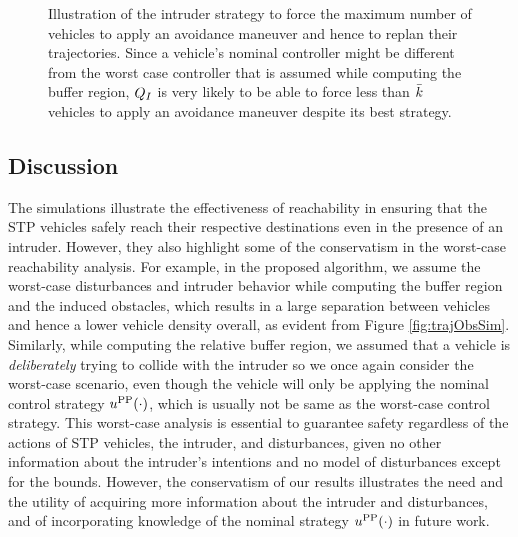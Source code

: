 \begin{figure}
\begin{subfigure}{.5\columnwidth}
  \subcaption{}
  \label{fig:normalcase3}
\end{subfigure}%
\caption{Illustration of the intruder strategy to force the maximum number of vehicles to apply an avoidance maneuver and hence to replan their trajectories. Since a vehicle's nominal controller might be different from the worst case controller that is assumed while computing the buffer region, $Q_{I}$ is very likely to be able to force less than $\bar{k}$ vehicles to apply an avoidance maneuver despite its best strategy.}
\label{fig:normalcase}
\end{figure}         

\subsection{Discussion \label{sec:discuss}}
The simulations illustrate the effectiveness of reachability in ensuring that the STP vehicles safely reach their respective destinations even in the presence of an intruder. However, they also highlight some of the conservatism in the worst-case reachability analysis. For example, in the proposed algorithm, we assume the worst-case disturbances and intruder behavior while computing the buffer region and the induced obstacles, which results in a large separation between vehicles and hence a lower vehicle density overall, as evident from Figure \ref{fig:trajObsSim}. Similarly, while computing the relative buffer region, we assumed that a vehicle is \textit{deliberately} trying to collide with the intruder so we once again consider the worst-case scenario, even though the vehicle will only be applying the nominal control strategy $u^{\text{PP}}(\cdot)$, which is usually not be same as the worst-case control strategy. This worst-case analysis is essential to guarantee safety regardless of the actions of STP vehicles, the intruder, and disturbances, given no other information about the intruder's intentions and no model of disturbances except for the bounds. However, the conservatism of our results illustrates the need and the utility of acquiring more information about the intruder and disturbances, and of incorporating knowledge of the nominal strategy $u^{\text{PP}}(\cdot)$ in future work.